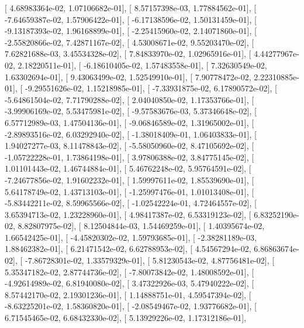 \documentclass{article}
\begin{document}
       [  4.68983364e-02,   1.07106682e-01],
       [  8.57157398e-03,   1.77884562e-01],
       [ -7.64659387e-02,   1.57906422e-01],
       [ -6.17138596e-02,   1.50131459e-01],
       [ -9.13187393e-02,   1.96168899e-01],
       [ -2.25415960e-02,   2.14071860e-01],
       [ -2.55820866e-02,   7.42871167e-02],
       [  4.53008671e-02,   9.55203470e-02],
       [  7.62821688e-03,   3.45534328e-02],
       [  7.84833970e-02,   1.02965916e-01],
       [  4.44277967e-02,   2.18220511e-01],
       [ -6.18610405e-02,   1.57483558e-01],
       [  7.32630549e-02,   1.63302694e-01],
       [  9.43063499e-02,   1.52549910e-01],
       [  7.90778472e-02,   2.22310885e-01],
       [ -9.29551626e-02,   1.15218985e-01],
       [ -7.33931875e-02,   6.17890572e-02],
       [ -5.64861504e-02,   7.71790288e-02],
       [  2.04040850e-02,   1.17353766e-01],
       [ -3.99906169e-02,   5.53475981e-02],
       [ -9.57583676e-03,   5.37346648e-02],
       [  6.57712989e-03,   1.47504136e-01],
       [ -9.06846589e-02,   1.31965002e-01],
       [ -2.89893516e-02,   6.03292940e-02],
       [ -1.38018409e-01,   1.06403833e-01],
       [  1.94027277e-03,   8.11478843e-02],
       [ -5.58050960e-02,   8.47105692e-02],
       [ -1.05722228e-01,   1.73864198e-01],
       [  3.97806388e-02,   3.84775145e-02],
       [  1.01101443e-02,   1.46744884e-01],
       [  5.46762248e-02,   5.95764591e-02],
       [ -7.24677856e-02,   1.91602232e-01],
       [  1.59997611e-02,   1.85539690e-01],
       [  5.64178749e-02,   1.43713103e-01],
       [ -1.25997476e-01,   1.01013408e-01],
       [ -5.83442211e-02,   8.59965566e-02],
       [ -1.02542224e-01,   4.72464557e-02],
       [  3.65394713e-02,   1.23228960e-01],
       [  4.98417387e-02,   6.53319123e-02],
       [  6.83252190e-02,   8.82807975e-02],
       [  8.12504844e-03,   1.54469259e-01],
       [  1.40395674e-02,   1.66542425e-01],
       [ -4.45820302e-02,   1.59793685e-01],
       [ -2.38281189e-03,   1.88462382e-01],
       [  6.21471542e-02,   6.62788953e-02],
       [  4.54567294e-02,   6.86863674e-02],
       [ -7.86728301e-02,   1.33579329e-01],
       [  5.81230543e-02,   4.87756481e-02],
       [  5.35347182e-02,   2.87744736e-02],
       [ -7.80073842e-02,   1.48008592e-01],
       [ -4.92614989e-02,   6.81940080e-02],
       [  3.47322926e-03,   5.47940222e-02],
       [  8.57442170e-02,   2.19301236e-01],
       [  1.14888751e-01,   4.59547394e-02],
       [ -8.63225201e-02,   1.58360820e-01],
       [ -2.08549467e-02,   1.93776682e-01],
       [  6.71545465e-02,   6.68432330e-02],
       [  5.13929226e-02,   1.17312186e-01],
\end{document}
